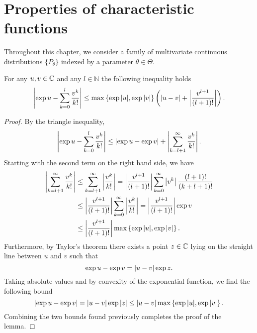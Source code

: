\section{Properties of characteristic functions}

Throughout this chapter, we consider a family of multivariate continuous distributions $\{ P_\theta \}$ indexed by a parameter $\theta \in \Theta$.



\begin{lemma} \label{lemma-series}
    For any $u, v \in \mathbb{C}$ and any $l \in \mathbb{N}$ the following inequality holds
    \begin{equation}
        \left|\exp{u} - \sum_{k=0}^l \frac{v^k}{k!}\right| \leq \max \left\{ \exp{|u|}, \exp{|v|} \right\}\left(\left|u - v\right| + \left|\frac{v^{l+1}}{(l+1)!}\right|\right).
    \end{equation}
\end{lemma}

\begin{proof}
    By the triangle inequality,
    \begin{equation*}
        \left|\exp{u} - \sum_{k=0}^l \frac{v^k}{k!}\right| \leq \left|\exp{u} - \exp{v}\right| + \left|\sum_{k=l+1}^\infty \frac{v^k}{k!}\right|.
    \end{equation*}
    Starting with the second term on the right hand side, we have
    \begin{align*}
        \left|\sum_{k=l+1}^\infty \frac{v^k}{k!}\right| 
        & \leq \sum_{k=l+1}^\infty \left|\frac{v^k}{k!}\right| 
        = \left|\frac{v^{l+1}}{(l+1)!}\right| \sum_{k=0}^\infty \left|v^k\right| \frac{(l+1)!}{(k + l + 1)!} \\
        & \leq \left|\frac{v^{l+1}}{(l+1)!}\right| \sum_{k=0}^\infty \left|\frac{v^k}{k!}\right|
        = \left|\frac{v^{l+1}}{(l+1)!}\right| \exp v\\
        &\leq \left|\frac{v^{l+1}}{(l+1)!}\right| \max \left\{ \exp{|u|}, \exp{|v|} \right\}.
    \end{align*}
    Furthermore, by Taylor's theorem there exists a point $z \in \mathbb{C}$ lying on the straight line between $u$ and $v$ such that
    \begin{equation*}
        \exp u - \exp v = \left|u - v\right| \exp z.
    \end{equation*}
    Taking absolute values and by convexity of the exponential function, we find the following bound
    \begin{equation*}
        \left|\exp u - \exp v\right| = \left|u - v\right| \exp |z| \leq \left|u - v\right| \max \left\{ \exp{|u|}, \exp{|v|} \right\}.
    \end{equation*}
    Combining the two bounds found previously completes the proof of the lemma.
\end{proof}


